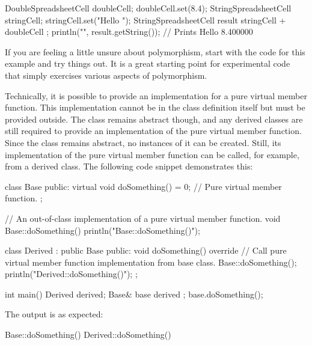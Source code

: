 \begin{cpp}
DoubleSpreadsheetCell doubleCell; doubleCell.set(8.4);
StringSpreadsheetCell stringCell; stringCell.set("Hello ");
StringSpreadsheetCell result { stringCell + doubleCell };
println("{}", result.getString()); // Prints Hello 8.400000
\end{cpp}

If you are feeling a little unsure about polymorphism, start with the code for this example and try things out. It is a great starting point for experimental code that simply exercises various aspects of polymorphism.


Technically, it is possible to provide an implementation for a pure virtual member function. This implementation cannot be in the class definition itself but must be provided outside. The class remains abstract though, and any derived classes are still required to provide an implementation of the pure virtual member function. Since the class remains abstract, no instances of it can be created. Still, its implementation of the pure virtual member function can be called, for example, from a derived class. The following code snippet demonstrates this:

\begin{cpp}
class Base
{
    public:
        virtual void doSomething() = 0; // Pure virtual member function.
};

// An out-of-class implementation of a pure virtual member function.
void Base::doSomething() { println("Base::doSomething()"); }

class Derived : public Base
{
    public:
        void doSomething() override
        {
            // Call pure virtual member function implementation from base class.
            Base::doSomething();
            println("Derived::doSomething()");
        }
};

int main()
{
    Derived derived;
    Base& base { derived };
    base.doSomething();
}
\end{cpp}

The output is as expected:

\begin{shell}
Base::doSomething()
Derived::doSomething()
\end{shell}





